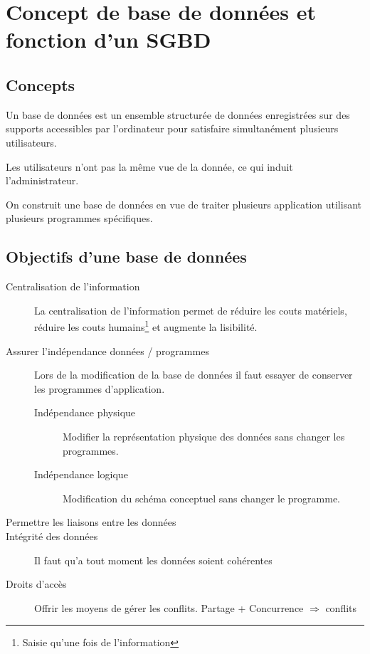 \documentclass[12pt,a4paper,openany]{book}
\newcommand{\bd}{base de données}
\begin{document}
	\thispagestyle{empty} %
	\titleBC 
	\dominitoc
	\setcounter{tocdepth}{1}
	\setcounter{secnumdepth}{3}
	\setcounter{minitocdepth}{1}
	\tableofcontents
	\chapter{Concept de base de données et fonction d'un SGBD}
		\section{Concepts}
		\begin{definition}
			Un base de données est un ensemble structurée de données enregistrées sur des supports accessibles par l'ordinateur pour satisfaire
			simultanément plusieurs utilisateurs.
		\end{definition}

		Les utilisateurs n'ont pas la même vue de la donnée, ce qui induit l'administrateur.
		\begin{remarque}
			On construit une \bd{} en vue de traiter plusieurs application utilisant plusieurs programmes spécifiques. 
		\end{remarque}

		\section{Objectifs d'une \bd{}}
			\begin{description}
				\item[Centralisation de l'information] La centralisation de l'information permet de réduire les couts matériels, réduire les couts humains\footnote{Saisie qu'une fois de l'information} et augmente la lisibilité.
				\item[Assurer l'indépendance données / programmes] Lors de la modification de la \bd{} il faut essayer de conserver les programmes d'application.
				\begin{description}
					\item[Indépendance physique] Modifier la représentation physique des données sans changer les programmes.
					\item[Indépendance logique] Modification du schéma conceptuel sans changer le programme.
				\end{description}
				\item[Permettre les liaisons entre les données] 
				\item[Intégrité des données] Il faut qu'a tout moment les données soient cohérentes
				\item[Droits d'accès] Offrir les moyens de gérer les conflits. Partage + Concurrence $\Rightarrow$ conflits
			\end{description}
		
\end{document}
